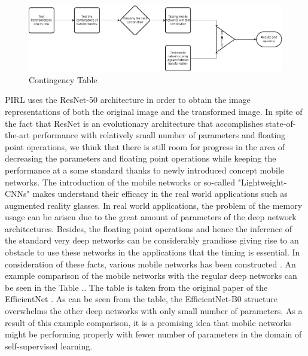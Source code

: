 \documentclass[conference]{IEEEtran}
\begin{document}
\begin{figure}[h]
\includegraphics[width=\textwidth]{flowchartcmpe597.png}
\centering
\caption{Contingency Table}
\label{fig2}
\end{figure}
PIRL uses the ResNet-50 \cite{resnet} architecture in order to obtain the image representations of both the original image and the transformed image. In spite of the fact that ResNet is an evolutionary architecture that accomplishes state-of-the-art performance with relatively small number of parameters and floating point operations, we think that there is still room for progress in the area of decreasing the parameters and floating point operations while keeping the performance at a some standard thanks to newly introduced concept mobile networks. The introduction of the mobile networks or so-called "Lightweight-CNNs" makes understand their efficacy in the real world applications such as augmented reality glasses. In real world applications, the problem of the memory usage can be arisen due to the great amount of parameters of the deep network architectures. Besides, the floating point operations and hence the inference of the standard very deep networks can be considerably grandiose giving rise to an obstacle to use these networks in the applications that the timing is essential. In consideration of these facts, various mobile networks has been constructed \cite{mnasnet,mobile2,efficientnet}. An example comparison of the mobile networks with the regular deep networks can be seen in the Table .. The table is taken from the original paper of the EfficientNet \cite{efficientnet}. As can be seen from the table, the EfficientNet-B0 structure overwhelms the other deep networks with only small number of parameters. As a result of this example comparison, it is a promising idea that mobile networks might be performing properly with fewer number of parameters in the domain of self-supervised learning.     
\end{document}
